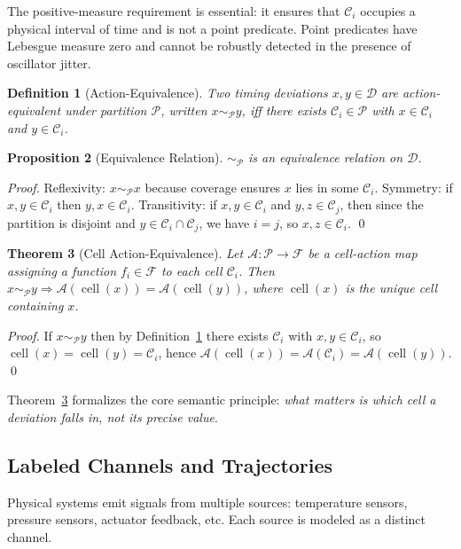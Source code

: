 \documentclass[twocolumn,10pt]{article}
\newtheorem{theorem}{Theorem}[section]
\newtheorem{proposition}[theorem]{Proposition}
\newtheorem{definition}[theorem]{Definition}
\newcommand{\calC}{\mathcal{C}}     %
\newcommand{\calD}{\mathcal{D}}     %
\newcommand{\calP}{\mathcal{P}}     %
\DeclareMathOperator{\cell}{cell}
\begin{document}
The positive-measure requirement is essential: it ensures that
$\calC_i$ occupies a physical interval of time and is not a point
predicate. Point predicates have Lebesgue measure zero and cannot
be robustly detected in the presence of oscillator jitter.

\begin{definition}[Action-Equivalence]
\label{def:actequiv}
Two timing deviations $x, y \in \calD$ are \emph{action-equivalent
under partition $\calP$}, written $x \sim_{\calP} y$, iff there
exists $\calC_i \in \calP$ with $x \in \calC_i$ and $y \in \calC_i$.
\end{definition}

\begin{proposition}[Equivalence Relation]
$\sim_{\calP}$ is an equivalence relation on $\calD$.
\end{proposition}
\begin{proof}
Reflexivity: $x \sim_{\calP} x$ because coverage ensures $x$ lies
in some $\calC_i$. Symmetry: if $x, y \in \calC_i$ then
$y, x \in \calC_i$. Transitivity: if $x, y \in \calC_i$ and
$y, z \in \calC_j$, then since the partition is disjoint and $y \in
\calC_i \cap \calC_j$, we have $i = j$, so $x, z \in \calC_i$. \qed
\end{proof}

\begin{theorem}[Cell Action-Equivalence]
\label{thm:cellequiv}
Let $\mathcal{A} : \calP \to \mathcal{F}$ be a cell-action map
assigning a function $f_i \in \mathcal{F}$ to each cell $\calC_i$.
Then $x \sim_{\calP} y \Rightarrow \mathcal{A}(\cell(x)) =
\mathcal{A}(\cell(y))$, where $\cell(x)$ is the unique cell
containing $x$.
\end{theorem}
\begin{proof}
If $x \sim_{\calP} y$ then by Definition~\ref{def:actequiv} there
exists $\calC_i$ with $x, y \in \calC_i$, so
$\cell(x) = \cell(y) = \calC_i$, hence
$\mathcal{A}(\cell(x)) = \mathcal{A}(\calC_i) = \mathcal{A}(\cell(y))$.
\qed
\end{proof}

Theorem~\ref{thm:cellequiv} formalizes the core semantic principle:
\emph{what matters is which cell a deviation falls in, not its
precise value}.

\subsection{Labeled Channels and Trajectories}

Physical systems emit signals from multiple sources: temperature
sensors, pressure sensors, actuator feedback, etc. Each source
is modeled as a distinct channel.
\end{document}

